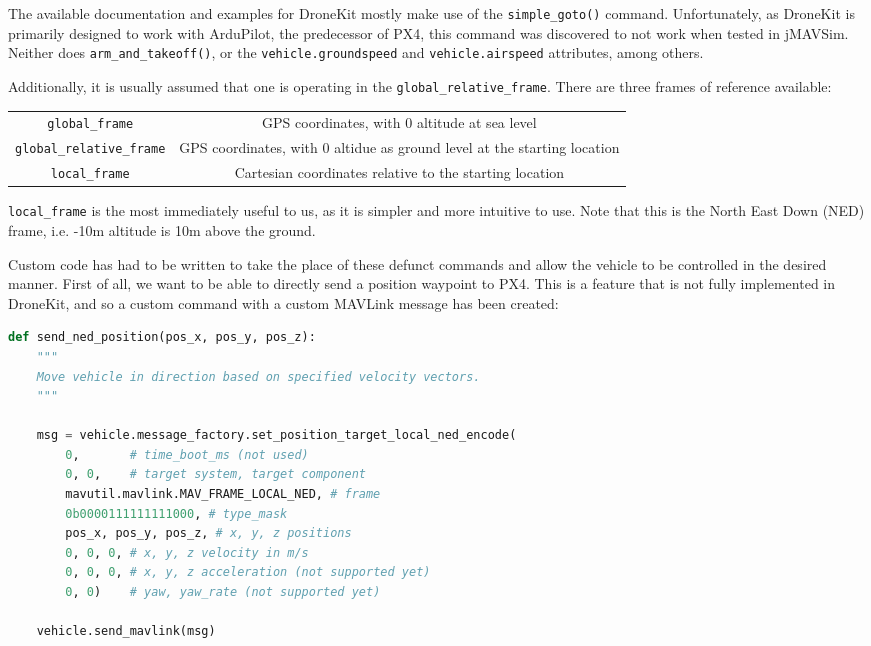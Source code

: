 \documentclass[11pt]{article}
\begin{document}
\label{control_implementation}
The available documentation and examples for DroneKit mostly make use of the \lstinline|simple_goto()| command. Unfortunately, as DroneKit is primarily designed to work with ArduPilot, the predecessor of PX4, this command was discovered to not work when tested in jMAVSim. Neither does \lstinline|arm_and_takeoff()|, or the \lstinline|vehicle.groundspeed| and \lstinline|vehicle.airspeed| attributes, among others.

Additionally, it is usually assumed that one is operating in the \lstinline|global_relative_frame|. There are three frames of reference available:
\begin{center}
\begin{tabular}{cc}
    \lstinline|global_frame| & GPS coordinates, with 0 altitude at sea level \\
    \lstinline|global_relative_frame| & GPS coordinates, with 0 altidue as ground level at the starting location \\
    \lstinline|local_frame| & Cartesian coordinates relative to the starting location
\end{tabular}
\end{center}
\lstinline|local_frame| is the most immediately useful to us, as it is simpler and more intuitive to use. Note that this is the North East Down (NED) frame, i.e. -10m altitude is 10m above the ground.

Custom code has had to be written to take the place of these defunct commands and allow the vehicle to be controlled in the desired manner. First of all, we want to be able to directly send a position waypoint to PX4. This is a feature that is not fully implemented in DroneKit, and so a custom command with a custom MAVLink message has been created:
\begin{lstlisting}[language=Python]
def send_ned_position(pos_x, pos_y, pos_z):
    """
    Move vehicle in direction based on specified velocity vectors.
    """

    msg = vehicle.message_factory.set_position_target_local_ned_encode(
        0,       # time_boot_ms (not used)
        0, 0,    # target system, target component
        mavutil.mavlink.MAV_FRAME_LOCAL_NED, # frame
        0b0000111111111000, # type_mask
        pos_x, pos_y, pos_z, # x, y, z positions
        0, 0, 0, # x, y, z velocity in m/s
        0, 0, 0, # x, y, z acceleration (not supported yet)
        0, 0)    # yaw, yaw_rate (not supported yet)

    vehicle.send_mavlink(msg)
\end{lstlisting}
\end{document}
